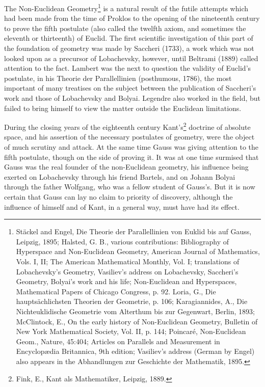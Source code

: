 \documentclass[oneside]{book}
\begin{document}
The Non-Euclidean Geometry\footnote{St\"ackel and Engel, Die
Theorie der Parallellinien von Euklid bis auf Gauss, Leipzig, 1895;
Halsted, G. B., various contributions: Bibliography of Hyperspace
and Non-Euclidean Geometry, American Journal of Mathematics,
Vols. I, II; The American Mathematical Monthly, Vol. I; translations
of Lobachevsky's Geometry, Vasiliev's address on Lobachevsky,
Saccheri's Geometry, Bolyai's work and his life; Non-Euclidean and
Hyperspaces, Mathematical Papers of Chicago Congress, p. 92. Loria,
G., Die haupts\"achlichsten Theorien der Geometrie, p. 106;
Karagiannides, A., Die Nichteuklidische Geometrie vom Alterthum bis
zur Gegenwart, Berlin, 1893; McClintock, E., On the early history of
Non-Euclidean Geometry, Bulletin of New York Mathematical Society,
Vol. II, p. 144; Poincar\'e, Non-Euclidean Geom., Nature, 45:404;
Articles on Parallels and Measurement in Encyclop\ae{}dia Britannica,
9th edition; Vasiliev's address (German by Engel) also appears in
the Abhandlungen zur Geschichte der Mathematik, 1895.} is a natural
result of the futile attempts which had been made from the time of
Proklos to the opening of the nineteenth century to prove the fifth
postulate (also called the twelfth axiom, and sometimes the eleventh
or thirteenth) of Euclid. The first scientific investigation of
this part of the foundation of geometry was made by Saccheri (1733),
a work which was not looked upon as a precursor of Lobachevsky,
however, until Beltrami (1889) called attention to the fact. Lambert
was the next to question the validity of Euclid's postulate, in his
Theorie der Parallellinien (posthumous, 1786), the most important of
many treatises on the subject between the publication of Saccheri's
work and those of Lobachevsky and Bolyai. Legendre also worked in
the field, but failed to bring himself to view the matter outside
the Euclidean limitations.

During the closing years of the eighteenth century
Kant's\footnote{Fink, E., Kant als Mathematiker, Leipzig, 1889.}
doctrine of absolute space, and his assertion of the necessary
postulates of geometry, were the object of much scrutiny and
attack. At the same time Gauss was giving attention to the fifth
postulate, though on the side of proving it. It was at one time
surmised that Gauss was the real founder of the non-Euclidean
geometry, his influence being exerted on Lobachevsky through his
friend Bartels, and on Johann Bolyai through the father Wolfgang,
who was a fellow student of Gauss's. But it is now certain that
Gauss can lay no claim to priority of discovery, although the
influence of himself and of Kant, in a general way, must have had
its effect.
\end{document}
